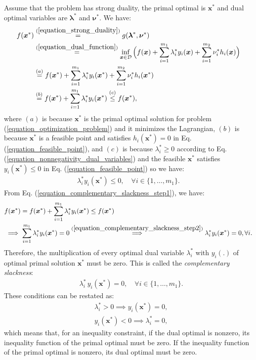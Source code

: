 \documentclass[lang=cn,10pt]{gorgeousnbook}
\numberwithin{equation}{section}%
\numberwithin{figure}{section}%
\begin{document}
Assume that the problem has strong duality, the primal optimal is $\boldsymbol{x}^*$ and dual optimal variables are $\boldsymbol{\lambda}^*$ and $\boldsymbol{\nu}^*$. We have:
\begin{align}
f(\boldsymbol{x}^*) &\overset{(\ref{equation_strong_duality})}{=} g(\boldsymbol{\lambda}^*, \boldsymbol{\nu}^*) \nonumber \\
&\overset{(\ref{equation_dual_function})}{=} \inf_{\boldsymbol{x} \in \mathcal{D}} \Big(f(\boldsymbol{x}) + \sum_{i=1}^{m_1} \lambda_i^* y_i(\boldsymbol{x}) + \sum_{i=1}^{m_2} \nu_i^* h_i(\boldsymbol{x})\Big) \nonumber \\
&\overset{(a)}{=} f(\boldsymbol{x}^*) + \sum_{i=1}^{m_1} \lambda_i^* y_i(\boldsymbol{x}^*) + \sum_{i=1}^{m_2} \nu_i^* h_i(\boldsymbol{x}^*) \nonumber \\
&\overset{(b)}{=} f(\boldsymbol{x}^*) + \sum_{i=1}^{m_1} \lambda_i^* y_i(\boldsymbol{x}^*) \overset{(c)}{\leq} f(\boldsymbol{x}^*), \label{equation_complementary_slackness_step1}
\end{align}
where $(a)$ is because $\boldsymbol{x}^*$ is the primal optimal solution for problem (\ref{equation_optimization_problem}) and it minimizes the Lagrangian, $(b)$ is because $\boldsymbol{x}^*$ is a feasible point and satisfies $h_i(\boldsymbol{x}^*)=0$ in Eq. (\ref{equation_feasible_point}), and $(c)$ is because $\lambda_i^* \geq 0$ according to Eq. (\ref{equation_nonnegativity_dual_variables}) and the feasible $\boldsymbol{x}^*$ satisfies $y_i(\boldsymbol{x}^*) \leq 0$ in Eq. (\ref{equation_feasible_point}) so we have:
\begin{align}\label{equation_complementary_slackness_step2}
\lambda_i^* y_i(\boldsymbol{x}^*) \leq 0, \quad \forall i \in \{1, \dots, m_1\}.
\end{align}
From Eq. (\ref{equation_complementary_slackness_step1}), we have:
\begin{align*}
&f(\boldsymbol{x}^*) = f(\boldsymbol{x}^*) + \sum_{i=1}^{m_1} \lambda_i^* y_i(\boldsymbol{x}^*) \leq f(\boldsymbol{x}^*) \\
&\implies \sum_{i=1}^{m_1} \lambda_i^* y_i(\boldsymbol{x}^*) = 0 \overset{(\ref{equation_complementary_slackness_step2})}{\implies} \lambda_i^* y_i(\boldsymbol{x}^*) = 0, \forall i. 
\end{align*}
Therefore, the multiplication of every optimal dual variable $\lambda_i^*$ with $y_i(.)$ of optimal primal solution $\boldsymbol{x}^*$ must be zero. 
This is called the \textit{complementary slackness}:
\begin{align}
& \lambda_i^*\, y_i(\boldsymbol{x}^*) = 0, \quad \forall i \in \{1, \dots, m_1\}.
\end{align}
These conditions can be restated as:
\begin{align}
&\lambda_i^* > 0 \implies y_i(\boldsymbol{x}^*) = 0, \\
&y_i(\boldsymbol{x}^*) < 0 \implies \lambda_i^* = 0, 
\end{align}
which means that, for an inequality constraint, if the dual optimal is nonzero, its inequality function of the primal optimal must be zero. If the inequality function of the primal optimal is nonzero, its dual optimal must be zero.
\end{document}
